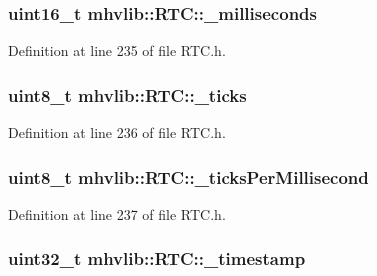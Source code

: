 \hypertarget{classmhvlib_1_1_r_t_c_a22ee8aadbcec10d624e37ce4c1c2796a}{
\subsubsection[{\-\_\-milliseconds}]{\setlength{\rightskip}{0pt plus 5cm}uint16\-\_\-t mhvlib\-::\-R\-T\-C\-::\-\_\-milliseconds\hspace{0.3cm}{\ttfamily [protected]}}}\label{classmhvlib_1_1_r_t_c_a22ee8aadbcec10d624e37ce4c1c2796a}


Definition at line 235 of file R\-T\-C.\-h.

\hypertarget{classmhvlib_1_1_r_t_c_a85bb4d09098ea477190bd97b08c09e7d}{
\subsubsection[{\-\_\-ticks}]{\setlength{\rightskip}{0pt plus 5cm}uint8\-\_\-t mhvlib\-::\-R\-T\-C\-::\-\_\-ticks\hspace{0.3cm}{\ttfamily [protected]}}}\label{classmhvlib_1_1_r_t_c_a85bb4d09098ea477190bd97b08c09e7d}


Definition at line 236 of file R\-T\-C.\-h.

\hypertarget{classmhvlib_1_1_r_t_c_ae87ddcdc3c98b9fc9d762fdcadb758f5}{
\subsubsection[{\-\_\-ticks\-Per\-Millisecond}]{\setlength{\rightskip}{0pt plus 5cm}uint8\-\_\-t mhvlib\-::\-R\-T\-C\-::\-\_\-ticks\-Per\-Millisecond\hspace{0.3cm}{\ttfamily [protected]}}}\label{classmhvlib_1_1_r_t_c_ae87ddcdc3c98b9fc9d762fdcadb758f5}


Definition at line 237 of file R\-T\-C.\-h.

\hypertarget{classmhvlib_1_1_r_t_c_ac9bca1039573baccfd05fd2ccb219495}{
\subsubsection[{\-\_\-timestamp}]{\setlength{\rightskip}{0pt plus 5cm}uint32\-\_\-t mhvlib\-::\-R\-T\-C\-::\-\_\-timestamp\hspace{0.3cm}{\ttfamily [protected]}}}\label{classmhvlib_1_1_r_t_c_ac9bca1039573baccfd05fd2ccb219495}


